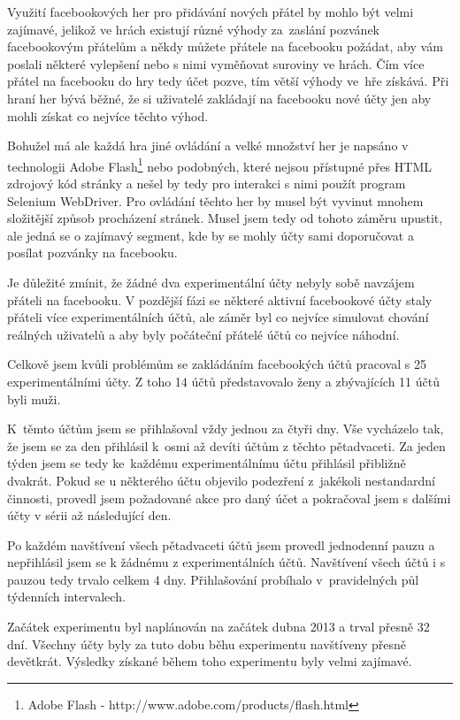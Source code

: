 \documentclass[thesis=M,czech]{FITthesis}[2013/05/10]
\begin{document}
Využití facebookových her pro přidávání nových přátel by mohlo být velmi zajímavé, jelikož ve hrách existují různé výhody za~zaslání pozvánek facebookovým přátelům a někdy můžete přátele na facebooku požádat, aby vám poslali některé vylepšení nebo s nimi vyměňovat suroviny ve hrách. Čím více přátel na facebooku do hry tedy účet pozve, tím větší výhody ve~hře získává. Při hraní her bývá běžné, že si uživatelé zakládají na facebooku nové účty jen aby mohli získat co nejvíce těchto výhod.

Bohužel má ale každá hra jiné ovládání a velké množství her je napsáno v technologii Adobe Flash\footnote{Adobe Flash - http://www.adobe.com/products/flash.html} nebo podobných, které nejsou přístupné přes HTML zdrojový kód stránky a nešel by tedy pro interakci s nimi použít program Selenium WebDriver. Pro ovládání těchto her by musel být vyvinut mnohem složitější způsob procházení stránek. Musel jsem tedy od tohoto záměru upustit, ale jedná se o zajímavý segment, kde by se mohly účty sami doporučovat a posílat pozvánky na facebooku.

Je důležité zmínit, že žádné dva experimentální účty nebyly sobě navzájem přáteli na facebooku. V pozdější fázi se některé aktivní facebookové účty staly přáteli více experimentálních účtů, ale záměr byl co nejvíce simulovat chování reálných uživatelů a aby byly počáteční přátelé účtů co nejvíce náhodní.

Celkově jsem kvůli problémům se zakládáním facebookých účtů pracoval s 25 experimentálními účty. Z toho 14 účtů představovalo ženy a zbývajících 11 účtů byli muži. 

K~těmto účtům jsem se přihlašoval vždy jednou za čtyři dny. Vše vycházelo tak, že jsem se za den přihlásil k~osmi až devíti účtům z těchto pětadvaceti. Za jeden týden jsem se tedy ke~každému experimentálnímu účtu přihlásil přibližně dvakrát. Pokud se u některého účtu objevilo podezření z~jakékoli nestandardní činnosti, provedl jsem požadované akce pro daný účet a pokračoval jsem s dalšími účty v sérii až následující den.

Po každém navštívení všech pětadvaceti účtů jsem provedl jednodenní pauzu a nepřihlásil jsem se k žádnému z experimentálních účtů. Navštívení všech účtů i s pauzou tedy trvalo celkem 4 dny. Přihlašování probíhalo v~pravidelných půl týdenních intervalech.

Začátek experimentu byl naplánován na začátek dubna 2013 a trval přesně 32 dní. Všechny účty byly za tuto dobu běhu experimentu navštíveny přesně devětkrát. Výsledky získané během toho experimentu byly velmi zajímavé.
\end{document}
